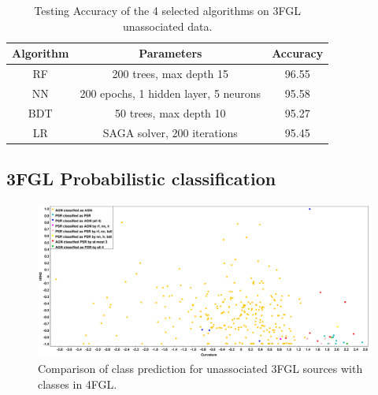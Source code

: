 \begin{table}[!h]
    \tiny
    \centering
    \renewcommand{\tabcolsep}{1mm}
\renewcommand{\arraystretch}{1.5}

    \begin{tabular}{|c|c|c|}
    \hline
    Algorithm&Parameters & Accuracy\\
    \hline
    RF& 200 trees, max depth 15  & 96.55   \\
    \hline
    NN & 200 epochs, 1 hidden layer, 5 neurons &  95.58 \\
    \hline %
    BDT & 50 trees, max depth 10    &   95.27  \\
    \hline
    LR & SAGA solver, 200 iterations & 95.45 \\
    \hline
     
    \end{tabular}

    \caption{Testing Accuracy of the 4 selected algorithms on 3FGL unassociated data.}
    \label{tab:selected_algs}
\end{table}


\subsection{3FGL Probabilistic classification} 

\begin{figure}[h]
\includegraphics[width=\twopicsp\textwidth]{plots/final_catalog.pdf}
\caption{Comparison of class prediction for unassociated 3FGL sources with classes in 4FGL. 
}
\label{fig:Maps_data}
\end{figure}
